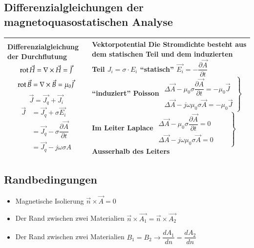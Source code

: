 \subsection{Differenzialgleichungen der magnetoquasostatischen Analyse}
\begin{tabular}{|p{} |p{}|}
	\hline
	\textbf{Differenzialgleichung der Durchflutung}\newline
	\[\operatorname{rot} \vec{H}=\nabla \times \vec{H}=\vec{J}\]
	\[\operatorname{rot} \vec{B}=\nabla \times \vec{B}=\mu_{0}\vec{J}\] \vspace{1cm} \[\vec{J} = \vec{J_q} + \vec{J_i}\] 
	{\begin{align*}
		\vec{J} &= \vec{J_q} + \sigma\vec{E_i} \\
		&= \vec{J_q} -\sigma\dfrac{\partial\vec{A}}{\partial t}\\
		&= \vec{J_q} - j\omega\sigma A
	\end{align*}} \vspace{-1cm}&
	\textbf{Vektorpotential}\newline
	Die Stromdichte besteht aus dem statischen Teil und dem induzierten Teil\newline
	$J_i=\sigma \cdot E_i $ \qquad``statisch''\newline
	$\vec{E_i}=-\dfrac{\partial \vec{A}}{\partial t}$ \qquad ``induziert''\newline \newline
    \textbf{Poisson}\newline
	$ \left. \begin{array}{c} \Delta\vec{A}-\mu_{0}\sigma \dfrac{\partial \vec{A}}{\partial t}=-\mu_{0}\vec{J}\\\Delta\vec{A}-j\omega\mu_{0}\sigma\vec{A}=-\mu_{0}\vec{J} \end{array} \right\}$ Im Leiter\newline \newline \newline 
    \textbf{Laplace}\newline
		$ \left. \begin{array}{c} \Delta\vec{A}-\mu_{0}\sigma \dfrac{\partial \vec{A}}{\partial t}=0\\\Delta\vec{A}-j\omega\mu_{0}\sigma\vec{A}=0 \end{array} \qquad \right\}$ Ausserhalb des Leiters\\
	\hline
\end{tabular}
\subsection{Randbedingungen}
\begin{itemize}
	\item Magnetische Isolierung $\vec{n} \times \vec{A} =0$
	\item Der Rand zwischen zwei Materialien $\vec{n} \times \vec{A_{1}}=\vec{n} \times \vec{A_{2}}$
	\item Der Rand zwischen zwei Materialien $B_{1}=B_{2} \rightarrow \dfrac{dA_{1}}{d n}=\dfrac{dA_{2}}{d n} $
\end{itemize}
